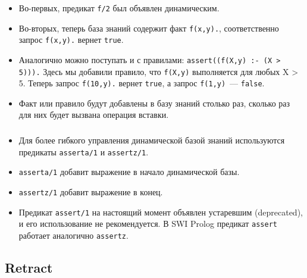 \begin{frame}

	\frametitle{\insertsection}
	\framesubtitle{\insertsubsection}
	
	\begin{itemize}
		\item Во-первых, предикат \texttt{f/2} был объявлен динамическим.
		\item Во-вторых, теперь база знаний содержит факт \texttt{f(x,y).}, соответственно запрос \texttt{f(x,y).} вернет \texttt{true}.
		\item Аналогично можно поступать и с правилами: \texttt{assert((f(X,y) :- (X > 5))).} Здесь мы добавили правило, что \texttt{f(X,y)} выполняется для любых X > 5. Теперь запрос \texttt{f(10,y).} вернет \texttt{true}, а запрос \texttt{f(1,y)}~--- \texttt{false}.
		\item Факт или правило будут добавлены в базу знаний столько раз, сколько раз для них будет вызвана операция вставки.
	\end{itemize}

\end{frame}



\begin{frame}

	\frametitle{\insertsection}
	\framesubtitle{\insertsubsection}
	
	\begin{itemize}
		\item Для более гибкого управления динамической базой знаний используются предикаты \texttt{asserta/1} и \texttt{assertz/1}.
		\item \texttt{asserta/1} добавит выражение в начало динамической базы.
		\item \texttt{assertz/1} добавит выражение в конец.
		\item Предикат \texttt{assert/1} на настоящий момент объявлен устаревшим (deprecated), и его использование не рекомендуется. В SWI Prolog предикат \texttt{assert} работает аналогично \texttt{assertz}.
	\end{itemize}

\end{frame}



\subsection{Retract}


